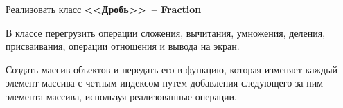 Реализовать класс \textbf{<<Дробь>>~-- Fraction}

В классе перегрузить операции сложения, вычитания, умножения,
деления, присваивания, операции отношения и вывода на экран.

Создать массив объектов
и передать его в функцию, которая изменяет каждый элемент массива с четным индексом
путем добавления следующего за ним элемента массива, используя реализованные
операции.
